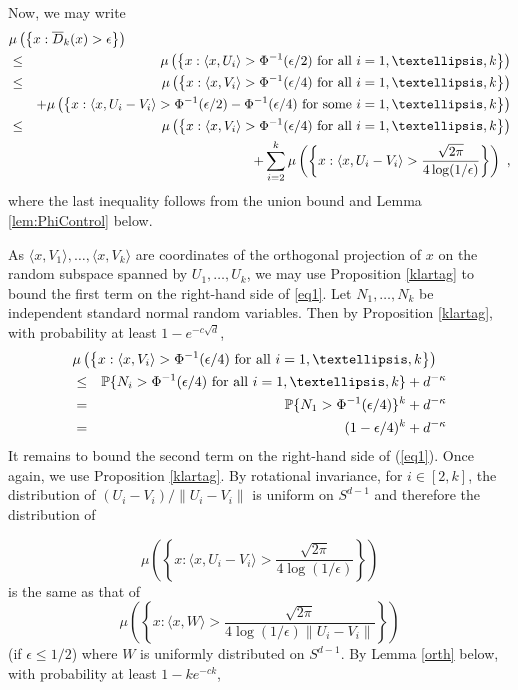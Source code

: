\documentclass[12pt]{article}
\newcommand{\ol}{\overline}
\newcommand{\field}[1]{\mathbb{#1}}
\newcommand{\PROB}{\field{P}}
\begin{document}
Now, we may write
\begin{eqnarray}
\label{eq1}
\lefteqn{
\mu\left(\left\{x:\ol{D}_k(x) > \epsilon\right\}\right)
} 
\nonumber \\*
& \le & 
\mu\left(\left\{x: \langle x,U_i\rangle > \Phi^{-1}(\epsilon/2) \ \mbox{for all $i=1,\ldots,k$} \right\}\right)  \nonumber \\
& \le & 
\mu\left(\left\{x: \langle x,V_i\rangle > \Phi^{-1}(\epsilon/4) \ \mbox{for all $i=1,\ldots,k$}\right\}\right)   \nonumber \\*
& & +
\mu\left(\left\{x: \langle x,U_i-V_i\rangle  > \Phi^{-1}(\epsilon/2)-\Phi^{-1}(\epsilon/4) \ 
\mbox{for some $i=1,\ldots,k$} \right\}\right)  \nonumber \\
& \le & 
\mu\left(\left\{x: \langle x,V_i\rangle  > \Phi^{-1}(\epsilon/4) \ \mbox{for all $i=1,\ldots,k$} \right\}\right)   \nonumber \\*
& & +
\sum_{i=2}^k \mu\left(\left\{x: \langle x,U_i-V_i\rangle  >  \frac{\sqrt{2\pi}}{4\log(1/\epsilon)}
\right\}\right)~,
\end{eqnarray}
where the last inequality follows from the union bound and  Lemma \ref{lem:PhiControl} below.

As $\langle x,V_1\rangle,\ldots,\langle x,V_k\rangle$ are coordinates of the orthogonal projection
of $x$ on the random subspace spanned by $U_1,\ldots,U_k$, we
may use Proposition \ref{klartag} to bound the first term
on the right-hand side of \eqref{eq1}. Let $N_1,\ldots,N_k$ be independent
standard normal random variables. Then by Proposition \ref{klartag},
with probability at least $1-e^{-c\sqrt{d}}$,
\begin{eqnarray*}
\lefteqn{
\mu\left(\left\{x: \langle x,V_i\rangle > \Phi^{-1}(\epsilon/4) \ \mbox{for all $i=1,\ldots,k$}\right\}\right)   
} \\
& \le &
\PROB\{ N_i > \Phi^{-1}(\epsilon/4) \ \mbox{for all $i=1,\ldots,k$} \}   
+ d^{-\kappa}  \\
& = & 
\PROB\{ N_1 > \Phi^{-1}(\epsilon/4)\}^k   
+ d^{-\kappa} \\
& = & 
(1-\epsilon/4)^k
+ d^{-\kappa} 
\end{eqnarray*}
It remains to bound the second term on the right-hand side of (\ref{eq1}).
Once again, we use Proposition \ref{klartag}. By rotational invariance, for $i\in[2,k]$,
the distribution of $ (U_i-V_i)/\|U_i-V_i\|$ is uniform on $S^{d-1}$ and
therefore the distribution of 

$$\mu\left(\left\{x: \langle x,U_i-V_i\rangle > \frac{\sqrt{2\pi}}{4\log(1/\epsilon)}
\right\}\right)$$
is the same as that of
\[
\mu\left(\left\{x: \langle x,W\rangle > \frac{\sqrt{2\pi}}{4\log(1/\epsilon)\|U_i-V_i\|}
\right\}\right)
\]
(if $\epsilon \le 1/2$)
where $W$ is uniformly distributed on $S^{d-1}$. By Lemma \ref{orth} below, with probability at least $1-ke^{-ck}$,
\end{document}
